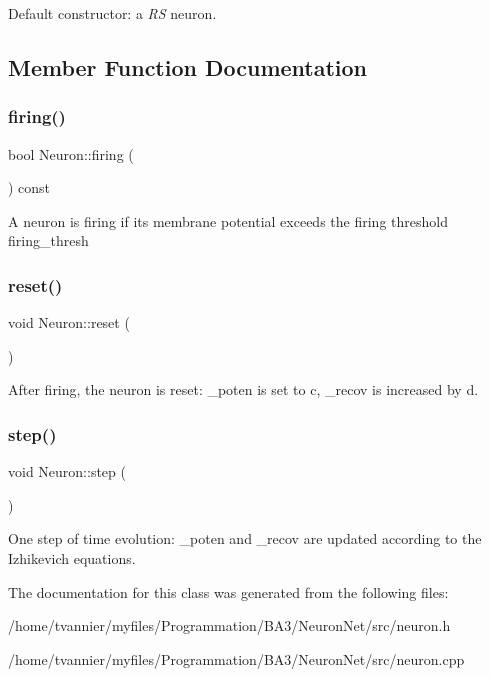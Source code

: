Default constructor\+: a {\itshape RS} neuron. 

\subsection{Member Function Documentation}
\mbox{\label{classNeuron_a4f477ebb623a7681c0f09dbfc4608a0d}} 
\subsubsection{\texorpdfstring{firing()}{firing()}}
{\footnotesize\ttfamily bool Neuron\+::firing (\begin{DoxyParamCaption}{ }\end{DoxyParamCaption}) const\hspace{0.3cm}{\ttfamily [inline]}}

A neuron is firing if its membrane potential exceeds the firing threshold firing\+\_\+thresh \mbox{\label{classNeuron_a6817fc5bf2128150b41b65e74f018408}} 
\subsubsection{\texorpdfstring{reset()}{reset()}}
{\footnotesize\ttfamily void Neuron\+::reset (\begin{DoxyParamCaption}{ }\end{DoxyParamCaption})\hspace{0.3cm}{\ttfamily [inline]}}

After firing, the neuron is reset\+: \+\_\+poten is set to {\ttfamily c}, \+\_\+recov is increased by {\ttfamily d}. \mbox{\label{classNeuron_a224d5cead5f94bbe15ae49774db3e174}} 
\subsubsection{\texorpdfstring{step()}{step()}}
{\footnotesize\ttfamily void Neuron\+::step (\begin{DoxyParamCaption}{ }\end{DoxyParamCaption})}

One step of time evolution\+: \+\_\+poten and \+\_\+recov are updated according to the Izhikevich equations. 

The documentation for this class was generated from the following files\+:\begin{DoxyCompactItemize}
\item 
/home/tvannier/myfiles/\+Programmation/\+B\+A3/\+Neuron\+Net/src/neuron.\+h\item 
/home/tvannier/myfiles/\+Programmation/\+B\+A3/\+Neuron\+Net/src/neuron.\+cpp\end{DoxyCompactItemize}
